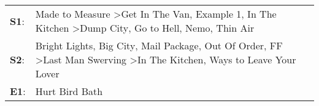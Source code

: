 \begin{supertabular}{p{0.03\textwidth}p{0.92\textwidth}}
 \textbf{S1}:  &  Made to Measure\textsuperscript{} \textgreater \enspace Get In The Van\textsuperscript{}, \enspace Example 1\textsuperscript{}, \enspace In The Kitchen\textsuperscript{} \textgreater \enspace Dump City\textsuperscript{}, \enspace Go to Hell\textsuperscript{}, \enspace Nemo\textsuperscript{}, \enspace Thin Air\textsuperscript{}  \enspace  \\
 \textbf{S2}:  &       Bright Lights, Big City\textsuperscript{}, \enspace Mail Package\textsuperscript{}, \enspace Out Of Order\textsuperscript{}, \enspace FF\textsuperscript{} \textgreater \enspace Last Man Swerving\textsuperscript{} \textgreater \enspace In The Kitchen\textsuperscript{},  Ways to Leave Your Lover\textsuperscript{}  \enspace  \\
 \textbf{E1}:  &                                                                                                                                                                                                                                                                                                          Hurt Bird Bath\textsuperscript{}  \enspace  \\
\end{supertabular}

